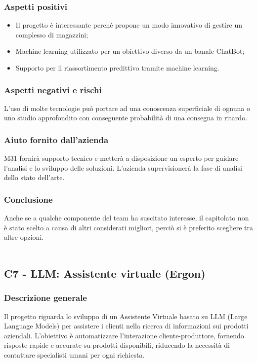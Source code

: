 \documentclass[10pt]{article}
\begin{document}
\subsubsection{Aspetti positivi}
\begin{itemize}
    \item Il progetto è interessante perché propone un modo innovativo di gestire un complesso di magazzini;
    \item Machine learning utilizzato per un obiettivo diverso da un banale ChatBot;
    \item Supporto per il riassortimento predittivo tramite machine learning.
\end{itemize}
\subsubsection{Aspetti negativi e rischi}
L’uso di molte tecnologie può portare ad una conoscenza superficiale di ognuna o uno studio approfondito con conseguente probabilità di una consegna in ritardo.
\subsubsection{Aiuto fornito dall'azienda}
M31 fornirà supporto tecnico e metterà a disposizione un esperto per guidare l'analisi e lo sviluppo delle soluzioni. L'azienda supervisionerà la fase di analisi dello stato dell'arte.
\subsubsection{Conclusione}
Anche se a qualche componente del team ha suscitato interesse, il capitolato non è stato scelto a causa di altri considerati migliori, perciò si è preferito scegliere tra altre opzioni.
\\\\
\subsection{C7 - LLM: Assistente virtuale (Ergon)}
\subsubsection{Descrizione generale}
Il progetto riguarda lo sviluppo di un Assistente Virtuale basato su LLM (Large Language Models) per assistere i clienti nella ricerca di informazioni sui prodotti aziendali. L'obiettivo è automatizzare l'interazione cliente-produttore, fornendo risposte rapide e accurate su prodotti disponibili, riducendo la necessità di contattare specialisti umani per ogni richiesta.
\end{document}
